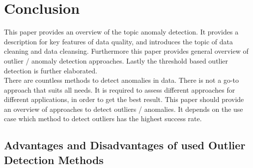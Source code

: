 \chapter{Conclusion}
This paper provides an overview of the topic anomaly detection. It provides a description for key features of data quality, and introduces the topic of data cleaning and data cleansing. Furthermore this paper provides general overview of outlier / anomaly detection approaches. Lastly the threshold based outlier detection is further elaborated.\\
There are countless methods to detect anomalies in data. There is not a go-to approach that suits all needs. It is required to assess different approaches for different applications, in order to get the best result. This paper should provide an overview of approaches to detect outliers / anomalies. It depends on the use case which method to detect outliers has the highest success rate.  
\section{Advantages and Disadvantages of used Outlier Detection Methods}

